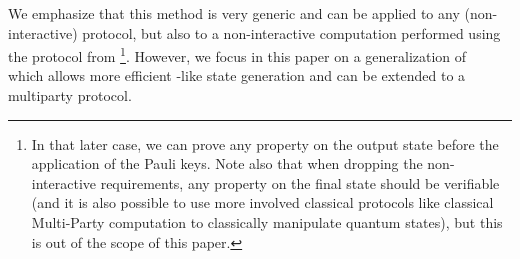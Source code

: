\begin{enumerate}[listparindent=\parindent]

        We emphasize that this method is very generic and can be applied to any (non-interactive) \RSP{} protocol, but also to a non-interactive computation performed using the protocol from \cite{mahadev2017classical}\footnote{In that later case, we can prove any property on the output state before the application of the Pauli keys.  Note also that when dropping the non-interactive requirements, any property on the final state should be verifiable (and it is also possible to use more involved classical protocols like classical Multi-Party computation to classically manipulate quantum states), but this is out of the scope of this paper.}. However, we focus in this paper on a generalization of~\cite{CCKW_2019_qfactory} which allows more efficient \GHZ{}-like state generation and can be extended to a multiparty protocol.


\end{enumerate}
